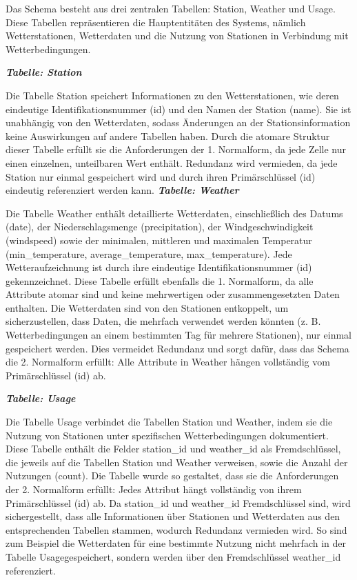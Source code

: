 \documentclass{article}
\begin{document}
\begin{enumerate}
Das Schema besteht aus drei zentralen Tabellen: Station, Weather und Usage. Diese Tabellen repräsentieren die Hauptentitäten des Systems, nämlich Wetterstationen, Wetterdaten und die Nutzung von Stationen in Verbindung mit Wetterbedingungen.
    
\textit{\textbf{Tabelle: Station}}
    
Die Tabelle Station speichert Informationen zu den Wetterstationen, wie deren eindeutige Identifikationsnummer (id) und den Namen der Station (name). Sie ist unabhängig von den Wetterdaten, sodass Änderungen an der Stationsinformation keine Auswirkungen auf andere Tabellen haben. Durch die atomare Struktur dieser Tabelle erfüllt sie die Anforderungen der 1. Normalform, da jede Zelle nur einen einzelnen, unteilbaren Wert enthält. Redundanz wird vermieden, da jede Station nur einmal gespeichert wird und durch ihren Primärschlüssel (id) eindeutig referenziert werden kann.
\newpage    
\textit{\textbf{Tabelle: Weather}}
    
Die Tabelle Weather enthält detaillierte Wetterdaten, einschließlich des Datums (date), der Niederschlagsmenge (precipitation), der Windgeschwindigkeit (windspeed) sowie der minimalen, mittleren und maximalen Temperatur (min\_temperature, average\_temperature, max\_temperature). Jede Wetteraufzeichnung ist durch ihre eindeutige Identifikationsnummer (id) gekennzeichnet. Diese Tabelle erfüllt ebenfalls die 1. Normalform, da alle Attribute atomar sind und keine mehrwertigen oder zusammengesetzten Daten enthalten.
Die Wetterdaten sind von den Stationen entkoppelt, um sicherzustellen, dass Daten, die mehrfach verwendet werden könnten (z. B. Wetterbedingungen an einem bestimmten Tag für mehrere Stationen), nur einmal gespeichert werden. Dies vermeidet Redundanz und sorgt dafür, dass das Schema die 2. Normalform erfüllt: Alle Attribute in Weather hängen vollständig vom Primärschlüssel (id) ab.

\textit{\textbf{Tabelle: Usage}}
    
Die Tabelle Usage verbindet die Tabellen Station und Weather, indem sie die Nutzung von Stationen unter spezifischen Wetterbedingungen dokumentiert. Diese Tabelle enthält die Felder station\_id und weather\_id als Fremdschlüssel, die jeweils auf die Tabellen Station und Weather verweisen, sowie die Anzahl der Nutzungen (count).
Die Tabelle wurde so gestaltet, dass sie die Anforderungen der 2. Normalform erfüllt: Jedes Attribut hängt vollständig von ihrem Primärschlüssel (id) ab. Da station\_id und weather\_id Fremdschlüssel sind, wird sichergestellt, dass alle Informationen über Stationen und Wetterdaten aus den entsprechenden Tabellen stammen, wodurch Redundanz vermieden wird. So sind zum Beispiel die Wetterdaten für eine bestimmte Nutzung nicht mehrfach in der Tabelle Usagegespeichert, sondern werden über den Fremdschlüssel weather\_id referenziert. \\
    

\end{enumerate}
\end{document}
